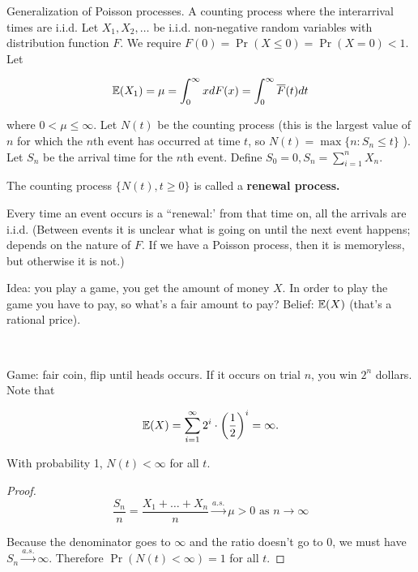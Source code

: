 Generalization of Poisson processes. A counting process where the interarrival times are i.i.d. Let \(X_1, X_2, \ldots\) be i.i.d. non-negative random variables with distribution function \(F\). We require \(F(0) = \Pr(X \leq 0) = \Pr(X=0) < 1\). Let

\[
\E(X_1) = \mu= \int_0^\infty x dF(x) = \int_0^\infty \overline{F}(t) dt
\]

where \(0 < \mu \leq \infty\). Let \(N(t)\) be the counting process (this is the largest value of \(n\) for which the \(n\)th event has occurred at time \(t\), so \(N(t) = \max \{n: S_n \leq t\}\) ). Let \(S_n\) be the arrival time for the \(n\)th event. Define \(S_0 = 0, S_n = \sum_{i=1}^n X_n\). 

\begin{definition} The counting process \(\{N(t), t \geq 0\}\) is called a \textbf{renewal process.}

\end{definition}

Every time an event occurs is a ``renewal:' from that time on, all the arrivals are i.i.d. (Between events it is unclear what is going on until the next event happens; depends on the nature of \(F\). If we have a Poisson process, then it is memoryless, but otherwise it is not.)

\begin{example}Idea: you play a game, you get the amount of money \(X\). In order to play the game you have to pay, so what's a fair amount to pay? Belief: \(\E(X)\) (that's a rational price).

\

Game: fair coin, flip until heads occurs. If it occurs on trial \(n\), you win \(2^n\) dollars. Note that

\[
\E(X) = \sum_{i=1}^\infty 2^i \cdot \bigg( \frac{1}{2} \bigg)^ i = \infty.
\]

\end{example}

\begin{proposition} With probability 1, \(N(t) < \infty\) for all \(t\).

\end{proposition}

\begin{proof}

\[
\frac{S_n}{n} = \frac{X_1 + \ldots + X_n}{n} \xrightarrow{a.s.} \mu > 0 \text{ as } n \to \infty
\]

Because the denominator goes to \(\infty\) and the ratio doesn't go to 0, we must have \(S_n \xrightarrow{a.s.} \infty\). Therefore \(\Pr(N(t) < \infty) = 1\) for all \(t\).

\end{proof}

